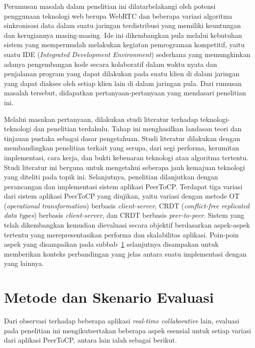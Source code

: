 Perumusan masalah dalam penelitian ini dilatarbelakangi oleh potensi penggunaan teknologi web berupa WebRTC dan beberapa variasi algoritma sinkronisasi data dalam suatu jaringan terdistribusi yang memiliki keuntungan dan kerugiannya masing-masing. Ide ini dikembangkan pula melalui kebutuhan sistem yang mempermudah melakukan kegiatan pemrograman kompetitif, yaitu suatu IDE (\textit{Integrated Development Environment}) sederhana yang memungkinkan adanya pengembangan kode secara kolaboratif dalam waktu nyata dan penjalanan program yang dapat dilakukan pada suatu klien di dalam jaringan yang dapat diakses oleh setiap klien lain di dalam jaringan pula. Dari rumusan masalah tersebut, didapatkan pertanyaan-pertanyaan yang mendasari penelitian ini.

Melalui masukan pertanyaan, dilakukan studi literatur terhadap teknologi-teknologi dan penelitian terdahulu. Tahap ini menghasilkan landasan teori dan tinjauan pustaka sebagai dasar pengetahuan. Studi literatur dilakukan dengan membandingkan penelitian terkait yang serupa, dari segi performa, kerumitan implementasi, cara kerja, dan bukti kebenaran teknologi atau algoritma tertentu. Studi literatur ini berguna untuk mengetahui seberapa jauh kemajuan teknologi yang diteliti pada topik ini. Selanjutnya, penelitian dilanjutkan dengan perancangan dan implementasi sistem aplikasi PeerToCP. Terdapat tiga variasi dari sistem aplikasi PeerToCP yang diujikan, yaitu variasi dengan metode OT (\textit{operational transformation}) berbasis \textit{client-server}, CRDT (\textit{conflict-free replicated data types}) berbasis \textit{client-server}, dan CRDT berbasis \textit{peer-to-peer}. Sistem yang telah dikembangkan kemudian dievaluasi secara objektif berdasarkan aspek-aspek tertentu yang merepresentasikan performa dan skalabilitas aplikasi. Poin-poin aspek yang disampaikan pada subbab~\ref{sec:evaluasi} selanjutnya disampakan untuk memberikan konteks perbandingan yang jelas antara suatu implementasi dengan yang lainnya.

\section{Metode dan Skenario Evaluasi}
\label{sec:evaluasi}

Dari observasi terhadap beberapa aplikasi \textit{real-time collaborative} lain, evaluasi pada penelitian ini mengikutsertakan beberapa aspek esensial untuk setiap variasi dari aplikasi PeerToCP, antara lain ialah sebagai berikut.

